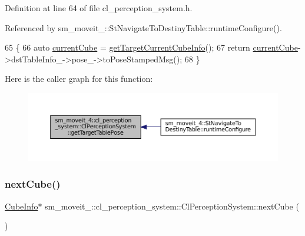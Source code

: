 Definition at line 64 of file cl\+\_\+perception\+\_\+system.\+h.



Referenced by sm\+\_\+moveit\+\_\+::\+St\+Navigate\+To\+Destiny\+Table\+::runtime\+Configure().


\begin{DoxyCode}
65             \{
66                 \textcolor{keyword}{auto} \hyperlink{classsm__moveit__4_1_1cl__perception__system_1_1ClPerceptionSystem_ae2a80b803814af8b3c87f810f2728af0}{currentCube} = \hyperlink{classsm__moveit__4_1_1cl__perception__system_1_1ClPerceptionSystem_ac4b944cebb2055a85a33129665df5dcf}{getTargetCurrentCubeInfo}();
67                 \textcolor{keywordflow}{return} \hyperlink{classsm__moveit__4_1_1cl__perception__system_1_1ClPerceptionSystem_ae2a80b803814af8b3c87f810f2728af0}{currentCube}->dstTableInfo\_->pose\_->toPoseStampedMsg();
68             \}
\end{DoxyCode}
Here is the caller graph for this function\+:
\nopagebreak
\begin{figure}[H]
\begin{center}
\leavevmode
\includegraphics[width=350pt]{classsm__moveit__4_1_1cl__perception__system_1_1ClPerceptionSystem_a84da4b68fddd1b2c81d69d5f7aafeb94_icgraph}
\end{center}
\end{figure}
\mbox{\label{classsm__moveit__4_1_1cl__perception__system_1_1ClPerceptionSystem_ab9ee8563cf55a88b34e81a2281da996f}} 
\subsubsection{\texorpdfstring{next\+Cube()}{nextCube()}}
{\footnotesize\ttfamily \hyperlink{structsm__moveit__4_1_1cl__perception__system_1_1CubeInfo}{Cube\+Info}$\ast$ sm\+\_\+moveit\+\_\+::cl\+\_\+perception\+\_\+system\+::\+Cl\+Perception\+System\+::next\+Cube (\begin{DoxyParamCaption}{ }\end{DoxyParamCaption})\hspace{0.3cm}{\ttfamily [inline]}}



